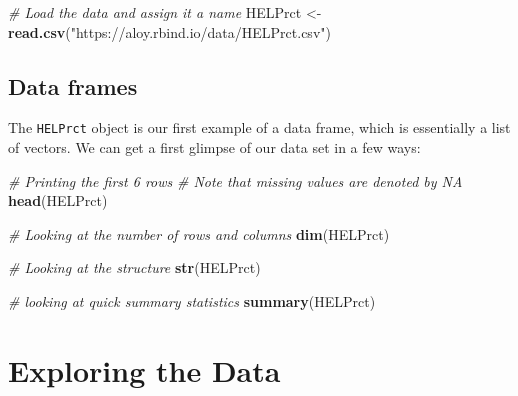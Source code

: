 \documentclass[]{article}
\newenvironment{Shaded}{\begin{snugshade}}{\end{snugshade}}
\newcommand{\KeywordTok}[1]{\textcolor[rgb]{0.13,0.29,0.53}{\textbf{#1}}}
\newcommand{\StringTok}[1]{\textcolor[rgb]{0.31,0.60,0.02}{#1}}
\newcommand{\CommentTok}[1]{\textcolor[rgb]{0.56,0.35,0.01}{\textit{#1}}}
\newcommand{\NormalTok}[1]{#1}
\begin{document}
\begin{Shaded}
\begin{Highlighting}[]
\CommentTok{# Load the data and assign it a name}
\NormalTok{HELPrct <-}\StringTok{ }\KeywordTok{read.csv}\NormalTok{(}\StringTok{"https://aloy.rbind.io/data/HELPrct.csv"}\NormalTok{)}
\end{Highlighting}
\end{Shaded}

\subsection{Data frames}\label{data-frames}

The \texttt{HELPrct} object is our first example of a data frame, which
is essentially a list of vectors. We can get a first glimpse of our data
set in a few ways:

\begin{Shaded}
\begin{Highlighting}[]
\CommentTok{# Printing the first 6 rows}
\CommentTok{# Note that missing values are denoted by NA}
\KeywordTok{head}\NormalTok{(HELPrct)}
\end{Highlighting}
\end{Shaded}

\begin{Shaded}
\begin{Highlighting}[]
\CommentTok{# Looking at the number of rows and columns}
\KeywordTok{dim}\NormalTok{(HELPrct)}
\end{Highlighting}
\end{Shaded}

\begin{Shaded}
\begin{Highlighting}[]
\CommentTok{# Looking at the structure}
\KeywordTok{str}\NormalTok{(HELPrct)}
\end{Highlighting}
\end{Shaded}

\begin{Shaded}
\begin{Highlighting}[]
\CommentTok{# looking at quick summary statistics}
\KeywordTok{summary}\NormalTok{(HELPrct)}
\end{Highlighting}
\end{Shaded}

\section{Exploring the Data}\label{exploring-the-data}
\end{document}

